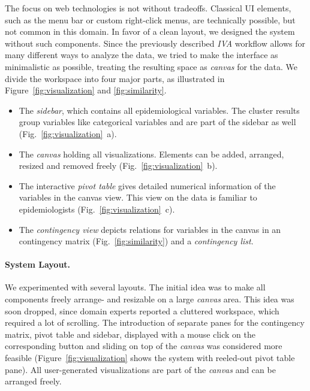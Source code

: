 \documentclass[journal]{style/vgtc} 			          %
\begin{document}
The focus on web technologies is not without tradeoffs.
%
Classical UI elements, such as the menu bar or custom right-click menus, are technically possible, but not common in this domain.
%
In favor of a clean layout, we designed the system without such components.
%
Since the previously described \emph{IVA} workflow allows for many different ways to analyze the data, we tried to make the interface as minimalistic as possible, treating the resulting space as \emph{canvas} for the data.
%
We divide the workspace into four major parts, as illustrated in Figure~\ref{fig:visualization} and \ref{fig:similarity}.
\begin{itemize} \itemsep0.2em
		\item The \emph{sidebar}, which contains all epidemiological variables. The cluster results group variables like categorical variables and are part of the sidebar as well (Fig.~\ref{fig:visualization}~a).
	\item The \emph{canvas} holding all visualizations. Elements can be added, arranged, resized and removed freely (Fig.~\ref{fig:visualization}~b).
	\item The interactive \emph{pivot table} gives detailed numerical information of the variables in the canvas view. This view on the data is familiar to epidemiologists (Fig.~\ref{fig:visualization}~c).
	\item The \emph{contingency view} depicts relations for variables in the canvas in an contingency matrix (Fig.~\ref{fig:similarity}) and a \emph{contingency list}.
\end{itemize}

\paragraph{System Layout.}
We experimented with several layouts.
%
The initial idea was to make all components freely arrange- and resizable on a large \emph{canvas} area.
%
This idea was soon dropped, since domain experts reported a cluttered workspace, which required a lot of scrolling.
%
The introduction of separate panes for the contingency matrix, pivot table and sidebar, displayed with a mouse click on the corresponding button and sliding on top of the \emph{canvas} was considered more feasible (Figure~\ref{fig:visualization} shows the system with reeled-out pivot table pane).
%
All user-generated visualizations are part of the \emph{canvas} and can be arranged freely.
\end{document}

